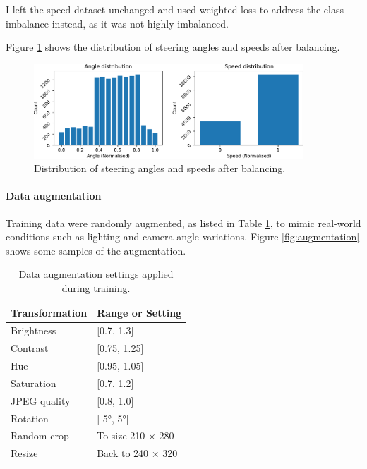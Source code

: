 \documentclass{article}
\begin{document}
I left the speed dataset unchanged and used weighted loss to address the class imbalance instead, as it was not highly imbalanced.

Figure \ref{fig:angle_speed_distribution_balanced} shows the distribution of steering angles and speeds after balancing.

\begin{figure}[h]
  \centering
  \includegraphics[width=0.9\textwidth]{figures/angle_speed_distribution_balanced.pdf}
  \caption{Distribution of steering angles and speeds after balancing.}
  \label{fig:angle_speed_distribution_balanced}
\end{figure}

\paragraph{Data augmentation}
\label{sec:data_augmentation}
Training data were randomly augmented, as listed in Table \ref{tab:data_augmentation}, to mimic real-world conditions such as lighting and camera angle variations. Figure \ref{fig:augmentation} shows some samples of the augmentation.

\begin{table}[H]
  \centering
  \renewcommand{\arraystretch}{1.2}
  \begin{tabular}{|l|l|}
    \hline
    \textbf{Transformation} & \textbf{Range or Setting} \\
    \hline
    Brightness              & [0.7, 1.3]                \\
    Contrast                & [0.75, 1.25]              \\
    Hue                     & [0.95, 1.05]              \\
    Saturation              & [0.7, 1.2]                \\
    JPEG quality            & [0.8, 1.0]                \\
    Rotation                & [-5°, 5°]                 \\
    Random crop             & To size 210 × 280         \\
    Resize                  & Back to 240 × 320         \\
    \hline
  \end{tabular}
  \vspace{0.5em}
  \caption{Data augmentation settings applied during training.}
  \label{tab:data_augmentation}
\end{table}
\end{document}
